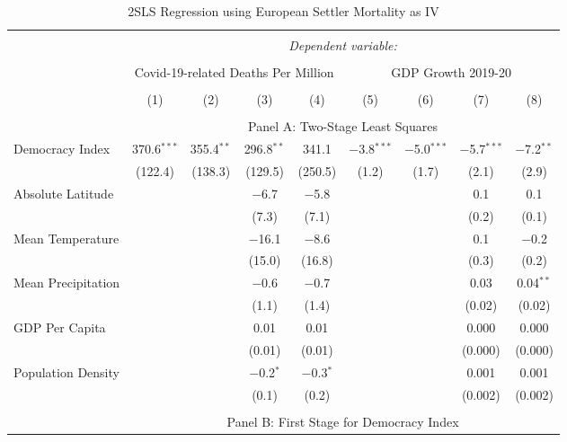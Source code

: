 

\begin{landscape}
\begin{table}[!htbp] \centering 
  \caption{2SLS Regression using European Settler Mortality as IV}
  \label{tab:2sls} 
  \begin{threeparttable}
\begin{tabular}{@{\extracolsep{0pt}}lcccccccc} 
\\[-1.8ex]\hline 
\hline \\[-1.8ex] 
 & \multicolumn{8}{c}{\textit{Dependent variable:}} \\ 
\cline{2-9} 
\\[-1.8ex] & \multicolumn{4}{c}{Covid-19-related Deaths Per Million} & \multicolumn{4}{c}{GDP Growth 2019-20} \\ 
\\[-1.8ex] & (1) & (2) & (3) & (4) & (5) & (6) & (7) & (8)\\ 
\hline \\[-1.8ex] 
  & \multicolumn{8}{c}{Panel A: Two-Stage Least Squares} \\
 Democracy Index & 370.6$^{***}$ & 355.4$^{**}$ & 296.8$^{**}$ & 341.1 & $-$3.8$^{***}$ & $-$5.0$^{***}$ & $-$5.7$^{***}$ & $-$7.2$^{**}$ \\ 
  & (122.4) & (138.3) & (129.5) & (250.5) & (1.2) & (1.7) & (2.1) & (2.9) \\ 
  Absolute Latitude &  &  & $-$6.7 & $-$5.8 &  &  & 0.1 & 0.1 \\ 
  &  &  & (7.3) & (7.1) &  &  & (0.2) & (0.1) \\ 
  Mean Temperature &  &  & $-$16.1 & $-$8.6 &  &  & 0.1 & $-$0.2 \\ 
  &  &  & (15.0) & (16.8) &  &  & (0.3) & (0.2) \\ 
  Mean Precipitation &  &  & $-$0.6 & $-$0.7 &  &  & 0.03 & 0.04$^{**}$ \\ 
  &  &  & (1.1) & (1.4) &  &  & (0.02) & (0.02) \\ 
  GDP Per Capita &  &  & 0.01 & 0.01 &  &  & 0.000 & 0.000 \\ 
  &  &  & (0.01) & (0.01) &  &  & (0.000) & (0.000) \\ 
  Population Density &  &  & $-$0.2$^{*}$ & $-$0.3$^{*}$ &  &  & 0.001 & 0.001 \\ 
  &  &  & (0.1) & (0.2) &  &  & (0.002) & (0.002) \\ 
 \hline \\[-1.8ex] 
   & \multicolumn{8}{c}{Panel B: First Stage for Democracy Index} \\

\end{tabular}
\end{threeparttable}
\end{table}
\end{landscape}
